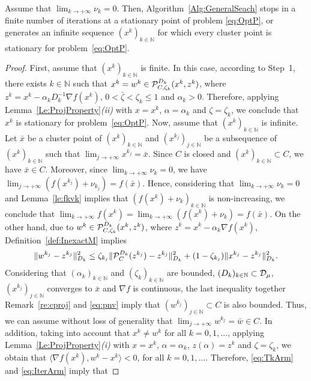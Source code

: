 \begin{proposition} \label{pr:statArm}
	Assume that $\lim_{k\to +\infty} \nu_{k} = 0$.   Then, Algorithm~\ref{Alg:GeneralSeach} stops in a finite number of iterations at a stationary point of problem \eqref{eq:OptP}, or generates an infinite sequence $(x^k)_{k\in\mathbb{N}}$ for which every cluster point is stationary for problem~\eqref{eq:OptP}.
\end{proposition}
\begin{proof}
	First, assume that $(x^k)_{k\in\mathbb{N}}$ is finite. In this case, according to Step~1,   there exists $k \in \mathbb{N}$ such that $x^k = w^k \in{\cal P}_{C, \zeta_k}^{D_k}(x^{k}, z^k)$, where $z^k = x^{k}-\alpha_k D_k^{-1}\nabla f(x^{k})$, $0 <{\bar \zeta}<\zeta_k \leq 1$ and $\alpha_k > 0$. Therefore, applying Lemma~\ref{Le:ProjProperty}{\it (ii)} with $x = x^{k}$, $\alpha = \alpha_k$ and $\zeta= \zeta_k$, we conclude that $x^k$ is stationary for problem~\eqref{eq:OptP}.  Now, assume that $(x^k)_{k\in\mathbb{N}}$ is infinite.   Let ${\bar x}$ be a cluster point of $(x^k)_{k\in\mathbb{N}}$ and $(x^{k_j})_{j\in\mathbb{N}}$ be a subsequence of $(x^k)_{k\in\mathbb{N}}$ such that $\lim_{j\to +\infty} x^{k_j} = \bar{x}$. Since $C$ is closed and  $(x^k)_{k\in\mathbb{N}}\subset C$,  we have $\bar{x} \in C$. Moreover,     since  $\lim_{k\to +\infty} \nu_{k} = 0$, we have $\lim_{j\to +\infty}\left(f(x^{k_j}) +\nu_{k_j}\right) =f(\bar{x})$. Hence, considering that  $\lim_{k\to +\infty} \nu_{k} = 0$ and Lemma~\ref{le:fkvk} implies  that   $\left(f(x^k)+\nu_{k}\right)_{k\in\mathbb{N}}$  is  non-increasing, we conclude that $\lim_{k\to +\infty} f(x^{k})= \lim_{k\to +\infty}\left(f(x^{k}) +\nu_{k}\right) =f(\bar{x})$.
	On the other hand,  due to  $w^k \in {\cal P}_{C, \zeta_k}^{D_k}(x^{k}, z^k)$, where $z^k = x^{k}-\alpha_k \nabla f(x^{k})$,  Definition~\ref{def:InexactM} implies
	\begin{equation} \label{eq:bsw}
		\|w^{k_j} - z^{k_j}\|_{D_k}^2\leq \zeta_{k_j} \| {\cal P}_{C}^{ D_k}(z^{k_j})-z^{k_j}\|_{D_k}^2+(1-\zeta_{k_j})\|x^{k_j}-z^{k_j}\|_{D_k}^2 .
	\end{equation}
	Considering that $(\alpha_k)_{k\in\mathbb{N}}$ and $(\zeta_k)_{k\in\mathbb{N}}$ are bounded, $(D_k)_{k\in\mathbb{N}}\subset  {\cal D}_{\mu}$,  $(x^{k_j})_{j\in\mathbb{N}}$ converges to ${\bar x}$ and $\nabla f$ is continuous, the last inequality together Remark~\ref{re:cproj} and \eqref{eq:pnv}  imply that $(w^{k_j})_{j\in\mathbb{N}}\subset C$ is also bounded. Thus, we can assume without loss of generality that $\lim_{j\to +\infty} w^{k_j} = \bar{w}\in C$.  In addition,  taking into account that  $x^k \neq w^k$ for all $k = 0,1, \ldots$, applying Lemma~\ref{Le:ProjProperty}{\it (i)} with $x = x^{k}$, $\alpha = \alpha_k$, $z(\alpha)=z^k$ and $\zeta= \zeta_k$, we obtain  that $\langle \nabla f(x^k), w^k- x^k \rangle < 0$, for all $k = 0, 1, \ldots$. Therefore,  \eqref{eq:TkArm} and \eqref{eq:IterArm} imply that

\end{proof}

